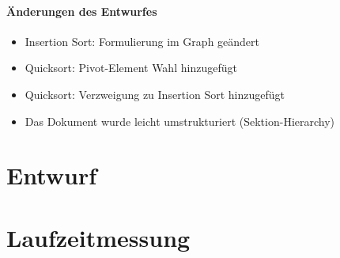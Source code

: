 \documentclass[11pt]{article}
\begin{document}
    \paragraph*{Änderungen des Entwurfes}
    \begin{itemize}
        \setlength\itemsep{0em}
        \item Insertion Sort: Formulierung im Graph geändert
        \item Quicksort: Pivot-Element Wahl hinzugefügt
        \item Quicksort: Verzweigung zu Insertion Sort hinzugefügt
        \item Das Dokument wurde leicht umstrukturiert (Sektion-Hierarchy)
    \end{itemize}


    \section{Entwurf}\label{sec:entwurf}
    

    \newpage

    \section{Laufzeitmessung}\label{sec:laufzeitmessung}
    
\end{document}
